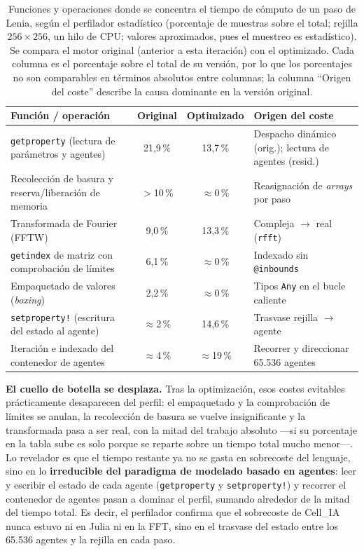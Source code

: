 \begin{table}[H]
\centering
\caption{Funciones y operaciones donde se concentra el tiempo de cómputo de un
paso de Lenia, según el perfilador estadístico (porcentaje de muestras sobre el
total; rejilla $256\times256$, un hilo de CPU; valores aproximados, pues el
muestreo es estadístico). Se compara el motor original (anterior a esta
iteración) con el optimizado. Cada columna es el porcentaje sobre el total de su
versión, por lo que los porcentajes no son comparables en términos absolutos
entre columnas; la columna ``Origen del coste'' describe la causa dominante en
la versión original.}
\label{tab:profiling_lenia}
\begin{tabular}{@{}lccl@{}}
\toprule
\textbf{Función / operación} & \textbf{Original} & \textbf{Optimizado} & \textbf{Origen del coste} \\ \midrule
\texttt{getproperty} (lectura de parámetros y agentes) & 21{,}9\,\% & 13{,}7\,\% & Despacho dinámico (orig.); lectura de agentes (resid.) \\
Recolección de basura y reserva/liberación de memoria   & $>$10\,\% & $\approx$0\,\% & Reasignación de \textit{arrays} por paso \\
Transformada de Fourier (FFTW)                          & 9{,}0\,\% & 13{,}3\,\% & Compleja $\rightarrow$ real (\texttt{rfft}) \\
\texttt{getindex} de matriz con comprobación de límites & 6{,}1\,\% & $\approx$0\,\% & Indexado sin \texttt{@inbounds} \\
Empaquetado de valores (\textit{boxing})                & 2{,}2\,\% & $\approx$0\,\% & Tipos \texttt{Any} en el bucle caliente \\
\texttt{setproperty!} (escritura del estado al agente)  & $\approx$2\,\% & 14{,}6\,\% & Trasvase rejilla $\rightarrow$ agente \\
Iteración e indexado del contenedor de agentes          & $\approx$4\,\% & $\approx$19\,\% & Recorrer y direccionar 65.536 agentes \\ \bottomrule
\end{tabular}
\end{table}

\textbf{El cuello de botella se desplaza.}
Tras la optimización, esos costes evitables prácticamente desaparecen del perfil:
el empaquetado y la comprobación de límites se anulan, la recolección de basura
se vuelve insignificante y la transformada pasa a ser real, con la mitad del
trabajo absoluto —si su porcentaje en la tabla sube es solo porque se reparte
sobre un tiempo total mucho menor—. Lo revelador es que el tiempo restante ya no se gasta en sobrecoste del
lenguaje, sino en lo \textbf{irreducible del paradigma de modelado basado en
agentes}: leer y escribir el estado de cada agente (\texttt{getproperty} y
\texttt{setproperty!}) y recorrer el contenedor de agentes pasan a dominar el
perfil, sumando alrededor de la mitad del tiempo total. Es decir, el perfilador
confirma que el sobrecoste de Cell\_IA nunca estuvo ni en Julia ni en la FFT,
sino en el trasvase del estado entre los 65.536 agentes y la rejilla en cada
paso.

